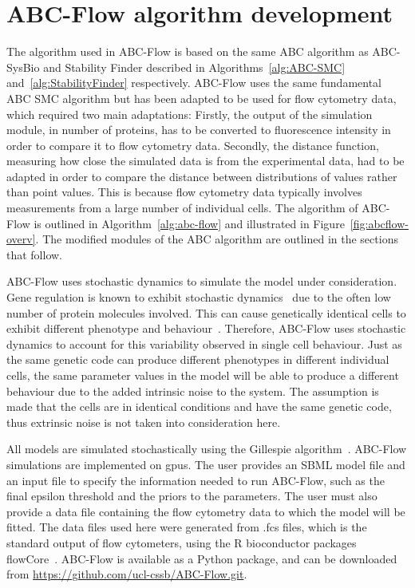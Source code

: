 \section{ABC-Flow algorithm development}
\label{sec:abcflow-meth}

The algorithm used in ABC-Flow is based on the same ABC algorithm as ABC-SysBio and Stability Finder described in Algorithms~\ref{alg:ABC-SMC} and~\ref{alg:StabilityFinder} respectively. ABC-Flow uses the same fundamental ABC SMC algorithm but has been adapted to be used for flow cytometry data, which required two main adaptations: Firstly, the output of the simulation module, in number of proteins, has to be converted to fluorescence intensity in order to compare it to flow cytometry data. Secondly, the distance function, measuring how close the simulated  data is from the experimental data, had to be adapted in order to compare the distance between distributions of values rather than point values. This is because flow cytometry data typically involves measurements from a large number of individual cells. The algorithm of ABC-Flow is outlined in Algorithm~\ref{alg:abc-flow} and illustrated in Figure~\ref{fig:abcflow-overv}. The modified modules of the ABC algorithm are outlined in the sections that follow.


ABC-Flow uses stochastic dynamics to simulate the model under consideration. Gene regulation is known to exhibit stochastic dynamics~\autocite{Elowitz:2002wq} due to the often low number of protein molecules involved. This can cause genetically identical cells to exhibit different phenotype and behaviour~\autocite{Weinberger:2005uv}. Therefore, ABC-Flow uses stochastic dynamics to account for this variability observed in single cell behaviour. Just as the same genetic code can produce different phenotypes in different individual cells, the same parameter values in the model will be able to produce a different behaviour due to the added intrinsic noise to the system. The assumption is made that the cells are in identical conditions and have the same genetic code, thus extrinsic noise is not taken into consideration here.  


All models are simulated stochastically using the Gillespie algorithm~\autocite{Gillespie:1977ww}. ABC-Flow simulations are implemented on \acrshort{gpu}s. The user provides an SBML model file and an input file to specify the information needed to run ABC-Flow, such as the final epsilon threshold and the priors to the parameters. The user must also provide a data file containing the flow cytometry data to which the model will be fitted. The data files used here were generated from .fcs files, which is the standard output of flow cytometers, using the R bioconductor packages flowCore~\autocite{flowCore:man}. ABC-Flow is available as a Python package, and can be downloaded from \url{https://github.com/ucl-cssb/ABC-Flow.git}. 



